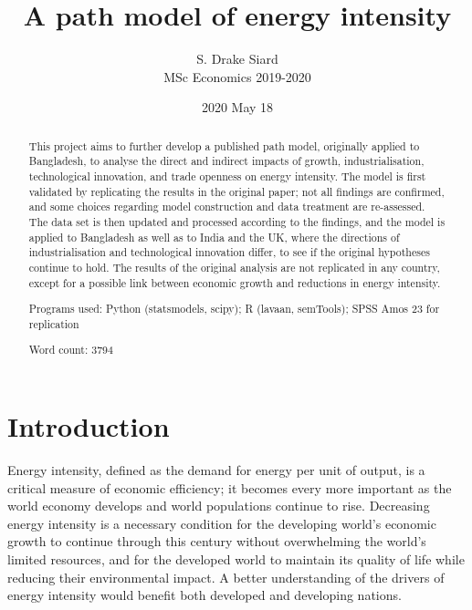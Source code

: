 \documentclass[11pt,a4paper]{article}
\title{\textbf{A path model of energy intensity}}
\author{S. Drake Siard\\
MSc Economics 2019-2020}
\date{2020 May 18}
\newcommand{\pkg}[1]{{\fontseries{b}\selectfont #1}}
\begin{document}
\maketitle

\begin{abstract}
This project aims to further develop a published path model, originally applied to Bangladesh, to analyse the direct and indirect impacts of growth, industrialisation, technological innovation, and trade openness on energy intensity.
The model is first validated by replicating the results in the original paper; not all findings are confirmed, and some choices regarding model construction and data treatment are re-assessed.
The data set is then updated and processed according to the findings, and the model is applied to Bangladesh as well as to India and the UK, where the directions of industrialisation and technological innovation differ, to see if the original hypotheses continue to hold.
The results of the original analysis are not replicated in any country, except for a possible link between economic growth and reductions in energy intensity.

Programs used: Python (\pkg{statsmodels}, \pkg{scipy}); R (\pkg{lavaan}, \pkg{semTools}); SPSS Amos 23 for replication

Word count: 3794
 
\end{abstract}

\tableofcontents

\pagebreak

\section{Introduction}\label{sec:introduction}

Energy intensity, defined as the demand for energy per unit of output, is a critical measure of economic efficiency; it becomes every more important as the world economy develops and world populations continue to rise.
Decreasing energy intensity is a necessary condition for the developing world's economic growth to continue through this century without overwhelming the world's limited resources, and for the developed world to maintain its quality of life while reducing their environmental impact.
A better understanding of the drivers of energy intensity would benefit both developed and developing nations.
\end{document}
